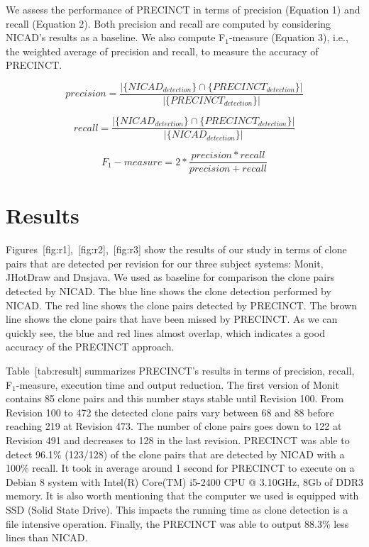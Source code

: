 We assess the performance of PRECINCT in terms of precision (Equation 1)
and recall (Equation 2). Both precision and recall are computed by
considering NICAD's results as a baseline. We also compute
F\(_{1}\)-measure (Equation 3), i.e., the weighted average of precision
and recall, to measure the accuracy of PRECINCT.

\[precision = \frac{|\{ NICAD_{detection} \} \cap \{ PRECINCT_{detection} \} |}{| \{ PRECINCT_{detection} \}|}\]

\[recall = \frac{|\{ NICAD_{detection} \} \cap \{ PRECINCT_{detection} \} |}{| \{ NICAD_{detection} \}|}\]

\[F_1-measure = 2 * \frac{precision * recall}{precision + recall}\]

\section{Results}\label{sub:Results}

Figures~{[}fig:r1{]},~{[}fig:r2{]},~{[}fig:r3{]} show the results of our
study in terms of clone pairs that are detected per revision for our
three subject systems: Monit, JHotDraw and Dnsjava. We used as baseline
for comparison the clone pairs detected by NICAD. The blue line shows
the clone detection performed by NICAD. The red line shows the clone
pairs detected by PRECINCT. The brown line shows the clone pairs that
have been missed by PRECINCT. As we can quickly see, the blue and red
lines almost overlap, which indicates a good accuracy of the PRECINCT
approach.

Table~{[}tab:result{]} summarizes PRECINCT's results in terms of
precision, recall, F\(_{1}\)-measure, execution time and output
reduction. The first version of Monit contains 85 clone pairs and this
number stays stable until Revision 100. From Revision 100 to 472 the
detected clone pairs vary between 68 and 88 before reaching 219 at
Revision 473. The number of clone pairs goes down to 122 at Revision 491
and decreases to 128 in the last revision. PRECINCT was able to detect
96.1\% (123/128) of the clone pairs that are detected by NICAD with a
100\% recall. It took in average around 1 second for PRECINCT to execute
on a Debian 8 system with Intel(R) Core(TM) i5-2400 CPU @ 3.10GHz, 8Gb
of DDR3 memory. It is also worth mentioning that the computer we used is
equipped with SSD (Solid State Drive). This impacts the running time as
clone detection is a file intensive operation. Finally, the PRECINCT was
able to output 88.3\% less lines than NICAD.


